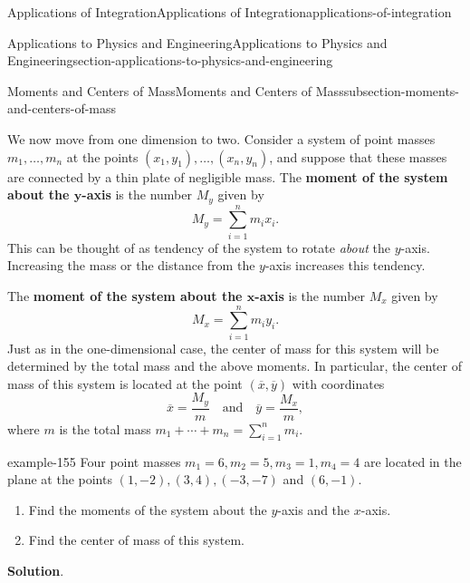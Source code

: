 \documentclass[oneside,10pt,]{book}
\newcommand{\terminology}[1]{\textbf{#1}}
\numberwithin{equation}{section}
\begin{document}
\begin{chapterptx}{Applications of Integration}{}{Applications of Integration}{}{}{applications-of-integration}
\begin{sectionptx}{Applications to Physics and Engineering}{}{Applications to Physics and Engineering}{}{}{section-applications-to-physics-and-engineering}
\begin{subsectionptx}{Moments and Centers of Mass}{}{Moments and Centers of Mass}{}{}{subsection-moments-and-centers-of-mass}
\begin{figure}
{
}
\end{figure}
\hypertarget{p-698}{}%
We now move from one dimension to two. Consider a system of point masses \(m_{1},\ldots,m_{n}\) at the points \((x_{1},y_{1}),\ldots,(x_{n},y_{n})\), and suppose that these masses are connected by a thin plate of negligible mass. The \terminology{moment of the system about the \(\boldsymbol{y}\)-axis} is the number \(M_{y}\) given by%
%
\begin{equation*}
M_{y} = \sum_{i=1}^{n}m_{i}x_{i}.
\end{equation*}
\hypertarget{p-699}{}%
This can be thought of as tendency of the system to rotate \emph{about} the \(y\)-axis. Increasing the mass or the distance from the \(y\)-axis increases this tendency.%
\par
\hypertarget{p-700}{}%
The \terminology{moment of the system about the \(\boldsymbol{x}\)-axis} is the number \(M_{x}\) given by%
\begin{equation*}
M_{x} = \sum_{i=1}^{n}m_{i}y_{i}.
\end{equation*}
Just as in the one-dimensional case, the center of mass for this system will be determined by the total mass and the above moments. In particular, the center of mass of this system is located at the point \((\overline{x},\overline{y})\) with coordinates%
\begin{equation*}
\overline{x} = \frac{M_{y}}{m}\quad\text{and}\quad\overline{y} = \frac{M_{x}}{m},
\end{equation*}
where \(m\) is the total mass \(m_{1}+\cdots+m_{n} = \sum_{i=1}^{n}m_{i}\).%
\begin{example}{}{example-155}%
\hypertarget{p-701}{}%
Four point masses \(m_{1} = 6,m_{2} = 5,m_{3} = 1,m_{4} = 4\) are located in the plane at the points \((1,-2),(3,4),(-3,-7)\) and \((6,-1)\).\leavevmode%
\begin{enumerate}
\item\hypertarget{li-59}{}\hypertarget{p-702}{}%
Find the moments of the system about the \(y\)-axis and the \(x\)-axis.%
\item\hypertarget{li-60}{}\hypertarget{p-703}{}%
Find the center of mass of this system.%
\end{enumerate}
%
\par\smallskip%
\noindent\textbf{Solution}.\hypertarget{solution-151}{}\quad%
\leavevmode%
\begin{enumerate}

\end{enumerate}
\end{example}
\end{subsectionptx}
\end{sectionptx}
\end{chapterptx}
\end{document}
